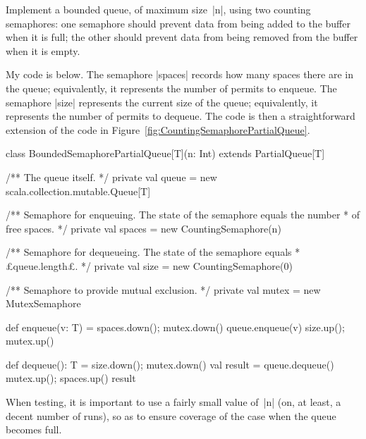 \begin{question}
Implement a bounded queue, of maximum size~|n|, using two counting
semaphores: one semaphore should prevent data from being added to the buffer
when it is full; the other should prevent data from being removed from the
buffer when it is empty.
\end{question}

\begin{answerI}
My code is below.  The semaphore |spaces| records how many spaces there are in
the queue; equivalently, it represents the number of permits to enqueue.  The
semaphore |size| represents the current size of the queue; equivalently, it
represents the number of permits to dequeue.  The code is then a
straightforward extension of the code in
Figure~\ref{fig:CountingSemaphorePartialQueue}.
%
\begin{scala}
class BoundedSemaphorePartialQueue[T](n: Int) extends PartialQueue[T]{
  /** The queue itself. */
  private val queue = new scala.collection.mutable.Queue[T]

  /** Semaphore for enqueuing.  The state of the semaphore equals the number
    * of free spaces. */
  private val spaces = new CountingSemaphore(n)

  /** Semaphore for dequeueing.  The state of the semaphore equals
    * £queue.length£. */
  private val size = new CountingSemaphore(0)

  /** Semaphore to provide mutual exclusion. */
  private val mutex = new MutexSemaphore

  def enqueue(v: T) = {
    spaces.down(); mutex.down()
    queue.enqueue(v)
    size.up(); mutex.up()
  }

  def dequeue(): T = {
    size.down(); mutex.down()
    val result = queue.dequeue()
    mutex.up(); spaces.up()
    result
  }
}
\end{scala}

When testing, it is important to use a fairly small value of~|n| (on, at
least, a decent number of runs), so as to ensure coverage of the case when the
queue becomes full. 
\end{answerI}
